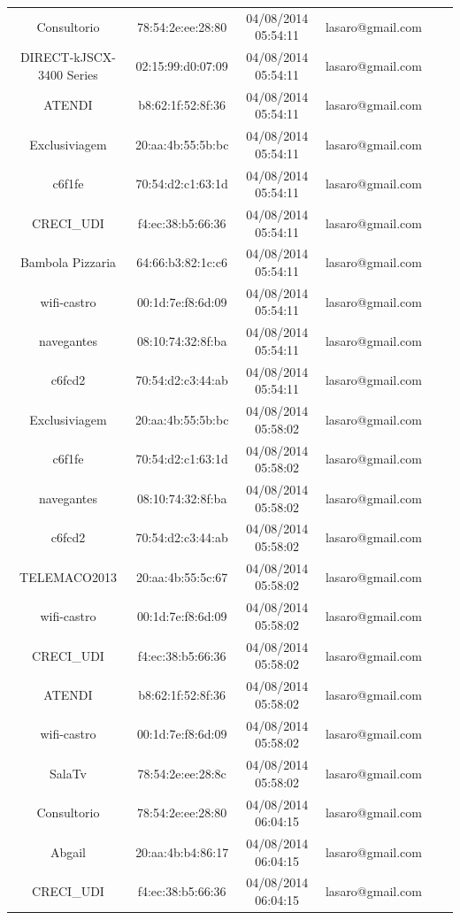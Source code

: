 \documentclass[12pt, %
openright, 
oneside,
a4paper,
brazil]{facom-ufu-abntex2}
\begin{document}
\begin{center}
\begin{longtable}{|c|c|c|c|c|c|}
Consultorio & 78:54:2e:ee:28:80 & 04/08/2014 05:54:11 & lasaro@gmail.com \\
DIRECT-kJSCX-3400 Series & 02:15:99:d0:07:09 & 04/08/2014 05:54:11 & lasaro@gmail.com \\
ATENDI & b8:62:1f:52:8f:36 & 04/08/2014 05:54:11 & lasaro@gmail.com \\
Exclusiviagem & 20:aa:4b:55:5b:bc & 04/08/2014 05:54:11 & lasaro@gmail.com \\
c6f1fe & 70:54:d2:c1:63:1d & 04/08/2014 05:54:11 & lasaro@gmail.com \\
CRECI\_UDI & f4:ec:38:b5:66:36 & 04/08/2014 05:54:11 & lasaro@gmail.com \\
Bambola Pizzaria & 64:66:b3:82:1c:c6 & 04/08/2014 05:54:11 & lasaro@gmail.com \\
wifi-castro & 00:1d:7e:f8:6d:09 & 04/08/2014 05:54:11 & lasaro@gmail.com \\
navegantes & 08:10:74:32:8f:ba & 04/08/2014 05:54:11 & lasaro@gmail.com \\
c6fcd2 & 70:54:d2:c3:44:ab & 04/08/2014 05:54:11 & lasaro@gmail.com \\
Exclusiviagem & 20:aa:4b:55:5b:bc & 04/08/2014 05:58:02 & lasaro@gmail.com \\
c6f1fe & 70:54:d2:c1:63:1d & 04/08/2014 05:58:02 & lasaro@gmail.com \\
navegantes & 08:10:74:32:8f:ba & 04/08/2014 05:58:02 & lasaro@gmail.com \\
c6fcd2 & 70:54:d2:c3:44:ab & 04/08/2014 05:58:02 & lasaro@gmail.com \\
TELEMACO2013 & 20:aa:4b:55:5c:67 & 04/08/2014 05:58:02 & lasaro@gmail.com \\
wifi-castro & 00:1d:7e:f8:6d:09 & 04/08/2014 05:58:02 & lasaro@gmail.com \\
CRECI\_UDI & f4:ec:38:b5:66:36 & 04/08/2014 05:58:02 & lasaro@gmail.com \\
ATENDI & b8:62:1f:52:8f:36 & 04/08/2014 05:58:02 & lasaro@gmail.com \\
wifi-castro & 00:1d:7e:f8:6d:09 & 04/08/2014 05:58:02 & lasaro@gmail.com \\
SalaTv & 78:54:2e:ee:28:8c & 04/08/2014 05:58:02 & lasaro@gmail.com \\
Consultorio & 78:54:2e:ee:28:80 & 04/08/2014 06:04:15 & lasaro@gmail.com \\
Abgail & 20:aa:4b:b4:86:17 & 04/08/2014 06:04:15 & lasaro@gmail.com \\
CRECI\_UDI & f4:ec:38:b5:66:36 & 04/08/2014 06:04:15 & lasaro@gmail.com \\

\end{longtable}
\end{center}
\end{document}
